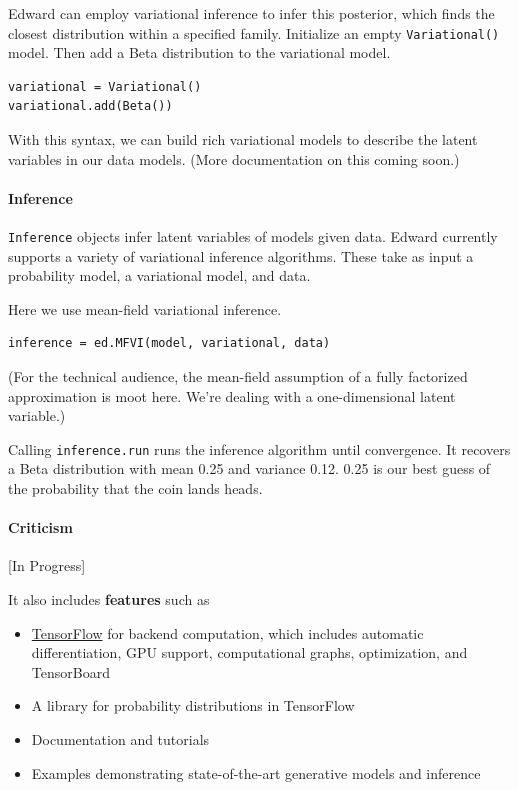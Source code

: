 Edward can employ variational inference to infer this posterior, which
finds the closest distribution within a specified family. Initialize an
empty \texttt{Variational()} model. Then add a Beta distribution to the
variational model.

\begin{verbatim}
variational = Variational()
variational.add(Beta())
\end{verbatim}

With this syntax, we can build rich variational models to describe the
latent variables in our data models. (More documentation on this coming
soon.)

\paragraph{Inference}\label{inference}

\texttt{Inference} objects infer latent variables of models given data.
Edward currently supports a variety of variational inference algorithms.
These take as input a probability model, a variational model, and data.

Here we use mean-field variational inference.

\begin{verbatim}
inference = ed.MFVI(model, variational, data)
\end{verbatim}

(For the technical audience, the mean-field assumption of a fully
factorized approximation is moot here. We're dealing with a
one-dimensional latent variable.)

Calling \texttt{inference.run} runs the inference algorithm until
convergence. It recovers a Beta distribution with mean 0.25 and variance
0.12. 0.25 is our best guess of the probability that the coin lands
heads.

\paragraph{Criticism}\label{criticism}

{[}In Progress{]}




It also includes \textbf{features} such as
\begin{itemize}
\item \href{https://www.tensorflow.org}{TensorFlow} for backend computation,
  which includes automatic differentiation, GPU support, computational
  graphs, optimization, and TensorBoard
\item A library for probability distributions in TensorFlow
\item Documentation and tutorials
\item Examples demonstrating state-of-the-art generative models and
  inference
\end{itemize}


